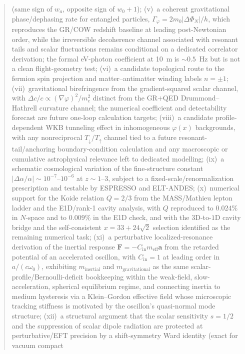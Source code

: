 \documentclass[aps,prd,onecolumn,superscriptaddress,nofootinbib,showpacs,12pt,notitlepage]{revtex4-2}
\newcommand{\meff}{m_{\mathrm{eff}}}
\begin{document}
\begin{abstract}
(same sign of $w_a$, opposite sign of $w_0+1$); (v)~a coherent
gravitational phase/dephasing rate for entangled particles,
$\Gamma_{\varphi} = 2m_0|\Delta\Phi_N|/h$, which reproduces the
GR/COW redshift baseline at leading post-Newtonian order, while the
irreversible decoherence channel associated with resonant tails and
scalar fluctuations remains conditional on a dedicated correlator
derivation; the formal eV-photon coefficient at 10~m is
$\sim 0.5$~Hz but is not a clean flight-geometry test;
(vi)~a candidate topological route to the fermion spin projection
and matter--antimatter winding labels $n = \pm 1$;
(vii)~gravitational birefringence from the gradient-squared scalar
channel, with $\Delta c/c \propto (\nabla\varphi)^2/m_e^2$
distinct from the GR$+$QED Drummond--Hathrell curvature channel;
the numerical coefficient and detectability forecast are future
one-loop calculation targets; (viii)~a candidate
profile-dependent WKB tunneling effect in inhomogeneous
$\varphi(x)$ backgrounds, with any nonreciprocal
$T_\downarrow/T_\uparrow$ channel tied to a future
resonant-tail/anchoring boundary-condition calculation and any
macroscopic or cumulative astrophysical relevance left to
dedicated modelling; (ix)~a schematic cosmological variation
of the fine-structure constant $|\Delta\alpha/\alpha| \sim 10^{-7}$--$10^{-6}$
at $z \sim 1$--$3$, subject to a fixed-scale/renormalization prescription
and testable by ESPRESSO and ELT-ANDES; (x)~numerical support for the Koide relation
$Q = 2/3$ from the MASS/Mathieu lepton ladder and the
E1D/rank-1 cavity analysis, with $Q$ reproduced to
$0.024\%$ in $N$-space and to $0.009\%$ in the E1D check,
and with the $3$D-to-$1$D cavity bridge and the
self-consistent $x = 33+24\sqrt{2}$ selection identified as
the remaining numerical task; (xi)~a perturbative localized-resonance
derivation of the inertial response
$\mathbf{F}=-C_{\mathrm{in}}\meff\mathbf{a}$ from the retarded
potential of an accelerated oscillon, with
$C_{\mathrm{in}}=1$ at leading order in $a/(c\omega_0)$,
exhibiting $m_{\mathrm{inertial}}$ and
$m_{\mathrm{gravitational}}$ as the same
scalar-profile/Bernoulli-deficit bookkeeping within the
weak-field, slow-acceleration, spherical equilibrium regime,
and connecting inertia to medium hysteresis via a
Klein--Gordon effective field whose microscopic tracking
stiffness is motivated by the oscillon's quasi-normal mode
structure;
(xii)~a structural argument that the scalar sensitivity
$s = 1/2$ and the suppression of scalar dipole radiation
are protected at perturbative/EFT precision by a
shift-symmetry Ward identity (exact for vacuum compact

\end{abstract}
\end{document}
